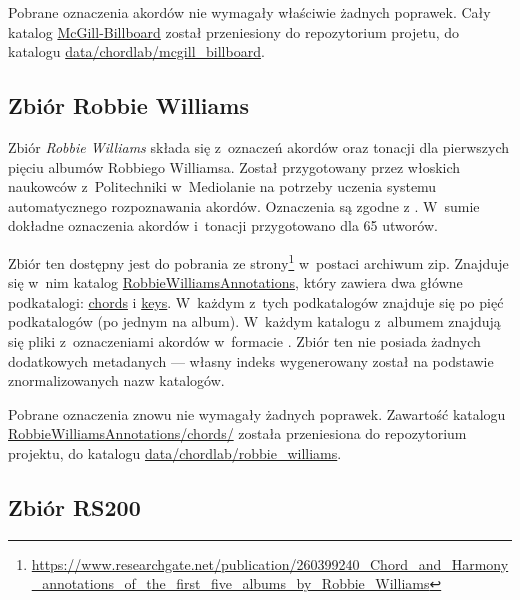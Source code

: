 Pobrane oznaczenia akordów nie wymagały właściwie żadnych poprawek. Cały katalog \url{McGill-Billboard} został przeniesiony do repozytorium projetu, do katalogu \url{data/chordlab/mcgill_billboard}.

\subsection{Zbiór Robbie Williams}

Zbiór \emph{Robbie Williams} \cite{giorgi_automatic_2013} składa się z~oznaczeń akordów oraz tonacji dla pierwszych pięciu albumów Robbiego Williamsa. Został przygotowany przez włoskich naukowców z~Politechniki w~Mediolanie na potrzeby uczenia systemu automatycznego rozpoznawania akordów.  Oznaczenia są zgodne z \cite{harte_towards_nodate}. W~sumie dokładne oznaczenia akordów i~tonacji przygotowano dla 65 utworów.

Zbiór ten dostępny jest do pobrania ze strony\footnote{\url{https://www.researchgate.net/publication/260399240_Chord_and_Harmony_annotations_of_the_first_five_albums_by_Robbie_Williams}} w~postaci archiwum zip. Znajduje się w~nim katalog \url{RobbieWilliamsAnnotations}, który zawiera dwa główne podkatalogi: \url{chords} i \url{keys}. W~każdym z~tych podkatalogów znajduje się po pięć podkatalogów (po jednym na album). W~każdym katalogu z~albumem znajdują się pliki  z~oznaczeniami akordów w~formacie . Zbiór ten nie posiada żadnych dodatkowych metadanych --- własny indeks wygenerowany został na podstawie znormalizowanych nazw katalogów.

Pobrane oznaczenia znowu nie wymagały żadnych poprawek. Zawartość katalogu \url{RobbieWilliamsAnnotations/chords/} została przeniesiona do repozytorium projektu, do katalogu \url{data/chordlab/robbie_williams}.

\subsection{Zbiór RS200}

